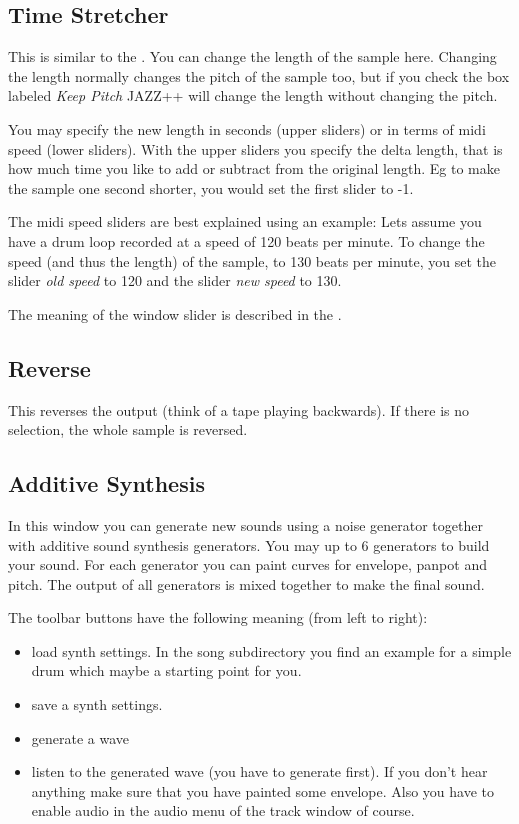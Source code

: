 \documentclass[letterpaper]{report}
\begin{document}
\subsection{Time Stretcher}

This is similar to the . You can
change the length of the sample here. Changing the length normally
changes the pitch of the sample too, but if you check the box labeled
{\em Keep Pitch} JAZZ++ will change the length without changing the pitch.

You may specify the new length in seconds (upper sliders) or in terms
of midi speed (lower sliders). With the upper sliders you specify the
delta length, that is how much time you like to add or subtract from
the original length. Eg to make the sample one second shorter, you
would set the first slider to -1.

The midi speed sliders are best explained using an example: Lets assume
you have a drum loop recorded at a speed of 120 beats per minute. To
change the speed (and thus the length) of the sample, to 130 beats per
minute, you set the slider {\em old speed} to 120 and the slider {\em new speed}
to 130.

The meaning of the window slider is described in the .



\subsection{Reverse}

This reverses the output (think of a tape playing backwards). If there
is no selection, the whole sample is reversed.



\subsection{Additive Synthesis}

In this window you can generate new sounds using a noise generator
together with additive sound synthesis generators. You may up to 6
generators to build your sound. For each generator you can paint curves
for envelope, panpot and pitch. The output of all generators is mixed
together to make the final sound.

The toolbar buttons have the following meaning (from left to right):
\begin{itemize}
\item load synth settings. In the song subdirectory you find an
example for a simple drum which maybe a starting point for you.
\item save a synth settings.
\item generate a wave
\item listen to the generated wave (you have to generate first). If you
don't hear anything make sure that you have painted some envelope. Also
you have to enable audio in the audio menu of the track window of course.
\end{itemize}
\end{document}
